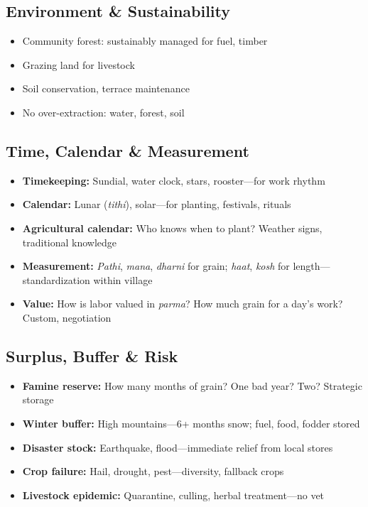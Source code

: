 \documentclass[11pt,a4paper]{article}
\begin{document}
\subsection{Environment \& Sustainability}
\begin{itemize}
    \item Community forest: sustainably managed for fuel, timber
    \item Grazing land for livestock
    \item Soil conservation, terrace maintenance
    \item No over-extraction: water, forest, soil
\end{itemize}

\subsection{Time, Calendar \& Measurement}
\begin{itemize}
    \item \textbf{Timekeeping:} Sundial, water clock, stars, rooster---for work rhythm
    \item \textbf{Calendar:} Lunar (\textit{tithi}), solar---for planting, festivals, rituals
    \item \textbf{Agricultural calendar:} Who knows when to plant? Weather signs, traditional knowledge
    \item \textbf{Measurement:} \textit{Pathi}, \textit{mana}, \textit{dharni} for grain; \textit{haat}, \textit{kosh} for length---standardization within village
    \item \textbf{Value:} How is labor valued in \textit{parma}? How much grain for a day's work? Custom, negotiation
\end{itemize}

\subsection{Surplus, Buffer \& Risk}
\begin{itemize}
    \item \textbf{Famine reserve:} How many months of grain? One bad year? Two? Strategic storage
    \item \textbf{Winter buffer:} High mountains---6+ months snow; fuel, food, fodder stored
    \item \textbf{Disaster stock:} Earthquake, flood---immediate relief from local stores
    \item \textbf{Crop failure:} Hail, drought, pest---diversity, fallback crops
    \item \textbf{Livestock epidemic:} Quarantine, culling, herbal treatment---no vet
\end{itemize}
\end{document}
